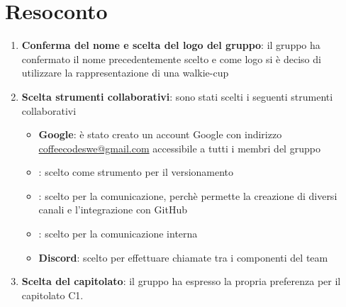 \documentclass{article}
\begin{document}
\section{Resoconto}%
\label{resoconto}
\begin{enumerate}
  \item \textbf{Conferma del nome e scelta del logo del gruppo}: il gruppo ha confermato il nome precedentemente scelto e come logo si è deciso di utilizzare la rappresentazione di una walkie-cup
  \item \textbf{Scelta strumenti collaborativi}: sono stati scelti i seguenti strumenti collaborativi
  \begin{itemize}
    \item \textbf{ Google}: è stato creato un account Google con indirizzo \href{mailto:coffeecodeswe@gmail.com}{coffeecodeswe@gmail.com} accessibile a tutti i membri del gruppo
    \item \textbf{}: scelto come strumento per il versionamento
    \item \textbf{}: scelto per la comunicazione, perchè permette la creazione di diversi canali e l'integrazione con GitHub
    \item \textbf{}: scelto per la comunicazione interna
    \item \textbf{Discord}: scelto per effettuare chiamate tra i componenti del team
  \end{itemize}
  \item \textbf{Scelta del capitolato}: il gruppo ha espresso la propria preferenza per il capitolato C1.
\end{enumerate}
\end{document}
